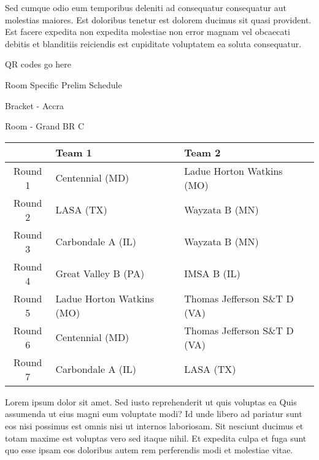 \documentclass{article}%
\begin{document}
\newline%
Sed cumque odio eum temporibus deleniti ad consequatur consequatur aut molestias maiores. Est doloribus tenetur est dolorem ducimus sit quasi provident. Est facere expedita non expedita molestiae non error magnam vel obcaecati debitis et blanditiis reiciendis est cupiditate voluptatem ea soluta consequatur.%
\vspace*{140pt}%
\begin{center}%
\begin{Huge}%
QR codes go here%
\end{Huge}%
\end{center}%
\newpage%
\begin{center}%
\begin{Huge}%
Room Specific Prelim Schedule%
\end{Huge}%
\vspace*{8pt}%
\linebreak%
\begin{Large}%
Bracket {-} Accra%
\end{Large}%
\vspace*{8pt}%
\linebreak%
\vspace*{8pt}%
\begin{Large}%
Room {-} Grand BR C%
\end{Large}%
\end{center}%
%
\begin{tabularx}{\textwidth}{|c|Y|Y|}%
\hline%
&Team 1&Team 2\\%
\hline%
Round 1&Centennial (MD)&Ladue Horton Watkins (MO)\\%
Round 2&LASA (TX)&Wayzata B (MN)\\%
Round 3&Carbondale A (IL)&Wayzata B (MN)\\%
Round 4&Great Valley B (PA)&IMSA B (IL)\\%
Round 5&Ladue Horton Watkins (MO)&Thomas Jefferson S\&T D (VA)\\%
Round 6&Centennial (MD)&Thomas Jefferson S\&T D (VA)\\%
Round 7&Carbondale A (IL)&LASA (TX)\\%
\hline%
\end{tabularx}%
\vspace*{8pt}%
\newline%
Lorem ipsum dolor sit amet. Sed iusto reprehenderit ut quis voluptas ea Quis assumenda ut eius magni eum voluptate modi? Id unde libero ad pariatur sunt eos nisi possimus est omnis nisi ut internos laboriosam. Sit nesciunt ducimus et totam maxime est voluptas vero sed itaque nihil. Et expedita culpa et fuga sunt quo esse ipsam eos doloribus autem rem perferendis modi et molestiae vitae.\newline%
\end{document}
